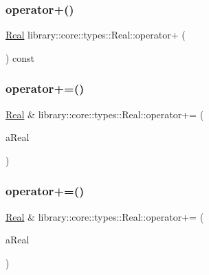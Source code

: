 \mbox{\label{classlibrary_1_1core_1_1types_1_1_real_a7f39b72df1d66f354dce558a99dc2da5}} 
\subsubsection{\texorpdfstring{operator+()}{operator+()}\hspace{0.1cm}{\footnotesize\ttfamily [3/3]}}
{\footnotesize\ttfamily \hyperlink{classlibrary_1_1core_1_1types_1_1_real}{Real} library\+::core\+::types\+::\+Real\+::operator+ (\begin{DoxyParamCaption}{ }\end{DoxyParamCaption}) const}

\mbox{\label{classlibrary_1_1core_1_1types_1_1_real_a9d6119549877717ef91876e1e53c78f9}} 
\subsubsection{\texorpdfstring{operator+=()}{operator+=()}\hspace{0.1cm}{\footnotesize\ttfamily [1/2]}}
{\footnotesize\ttfamily \hyperlink{classlibrary_1_1core_1_1types_1_1_real}{Real} \& library\+::core\+::types\+::\+Real\+::operator+= (\begin{DoxyParamCaption}\item[{const \hyperlink{classlibrary_1_1core_1_1types_1_1_real}{Real} \&}]{a\+Real }\end{DoxyParamCaption})}

\mbox{\label{classlibrary_1_1core_1_1types_1_1_real_af83f8f060152f4170325c20e521bb219}} 
\subsubsection{\texorpdfstring{operator+=()}{operator+=()}\hspace{0.1cm}{\footnotesize\ttfamily [2/2]}}
{\footnotesize\ttfamily \hyperlink{classlibrary_1_1core_1_1types_1_1_real}{Real} \& library\+::core\+::types\+::\+Real\+::operator+= (\begin{DoxyParamCaption}\item[{const \hyperlink{classlibrary_1_1core_1_1types_1_1_real_a9c5c8826b7e5a8e39544d23fea6c0e1c}{Real\+::\+Value\+Type} \&}]{a\+Real }\end{DoxyParamCaption})}

